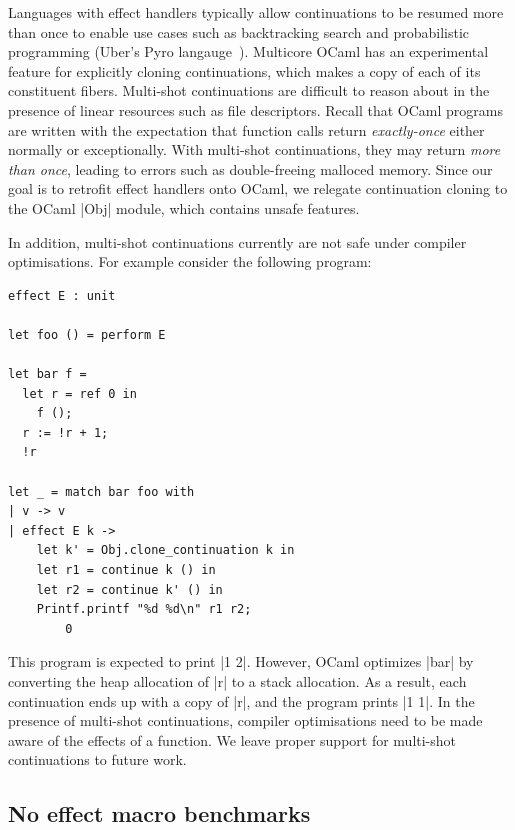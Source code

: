 \documentclass[sigplan,10pt,review,anonymous]{acmart}\settopmatter{printfolios=true,printccs=false,printacmref=false}
\begin{document}
Languages with effect handlers typically allow continuations to be resumed more
than once to enable use cases such as backtracking search and probabilistic
programming (Uber's Pyro langauge~\cite{Pyro}). Multicore OCaml has an
experimental feature for explicitly cloning continuations, which makes a copy
of each of its constituent fibers. Multi-shot continuations are difficult to
reason about in the presence of linear resources such as file descriptors.
Recall that OCaml programs are written with the expectation that function calls
return \emph{exactly-once} either normally or exceptionally. With multi-shot
continuations, they may return \emph{more than once}, leading to errors such as
double-freeing malloced memory. Since our goal is to retrofit effect handlers
onto OCaml, we relegate continuation cloning to the OCaml |Obj| module, which
contains unsafe features.

In addition, multi-shot continuations currently are not safe under compiler
optimisations. For example consider the following program:
\begin{lstlisting}
effect E : unit

let foo () = perform E

let bar f =
  let r = ref 0 in
	f ();
  r := !r + 1;
  !r

let _ = match bar foo with
| v -> v
| effect E k ->
    let k' = Obj.clone_continuation k in
    let r1 = continue k () in
    let r2 = continue k' () in
    Printf.printf "%d %d\n" r1 r2;
		0
\end{lstlisting}
This program is expected to print |1 2|. However, OCaml optimizes |bar| by
converting the heap allocation of |r| to a stack allocation. As a result, each
continuation ends up with a copy of |r|, and the program prints |1 1|. In the
presence of multi-shot continuations, compiler optimisations need to be made
aware of the effects of a function. We leave proper support for multi-shot
continuations to future work.

\subsection*{No effect macro benchmarks}
\end{document}
